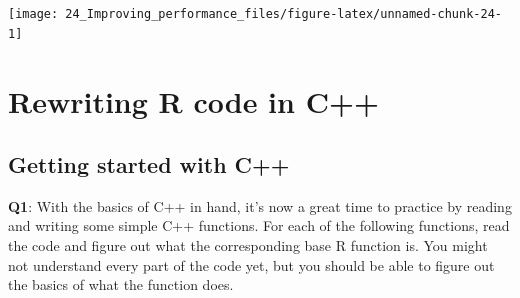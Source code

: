 \documentclass[
]{krantz}
\begin{document}
\begin{center}\texttt{[image: 24\_Improving\_performance\_files/figure-latex/unnamed-chunk-24-1]} \end{center}

\hypertarget{rewriting-r-code-in-c}{%
\chapter{Rewriting R code in C++}\label{rewriting-r-code-in-c}}


\hypertarget{getting-started-with-c}{%
\section{Getting started with C++}\label{getting-started-with-c}}

\textbf{{Q1}}: With the basics of C++ in hand, it's now a great time to practice by reading and writing some simple C++ functions. For each of the following functions, read the code and figure out what the corresponding base R function is. You might not understand every part of the code yet, but you should be able to figure out the basics of what the function does.
\end{document}
